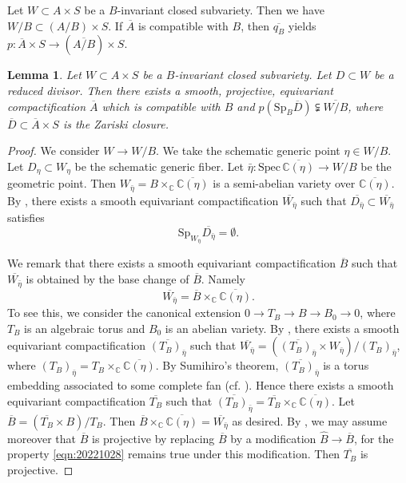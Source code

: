 \documentclass[11pt,english]{smfart}
\theoremstyle{plain}
\newtheorem{lem}[thm]{Lemma}
\theoremstyle{definition}
\theoremstyle{remark}
\numberwithin{equation}{section}
\theoremstyle{plain}
\begin{document}
	
	Let $W\subset A\times S$ be a $B$-invariant closed subvariety.
	Then we have $W/B\subset (A/B)\times S$.
	If $\overline{A}$ is compatible with $B$, then $\overline{q_B}$ yields $p:\overline{A}\times S\to(\overline{A/B})\times S$.
	
	
	\begin{lem}\label{lem:20221124}
		Let $W\subset A\times S$ be a $B$-invariant closed subvariety.
		Let $D\subset W$ be a reduced divisor.
		Then there exists a smooth, projective, equivariant compactification $\overline{A}$ which is compatible with $B$ and $p(\mathrm{Sp}_B\overline{D})\subsetneqq \overline{W/B}$, where $\overline{D}\subset \overline{A}\times S$ is the Zariski closure.
	\end{lem}
	
	\begin{proof}
		We consider $W\to W/B$.
		We take the schematic generic point $\eta\in W/B$.
		Let $D_{\eta}\subset W_{\eta}$ be the schematic generic fiber.
		Let $\bar{\eta}:\mathrm{Spec}\, \overline{\mathbb C(\eta)}\to W/B$ be the geometric point.
		Then $W_{\bar{\eta}}=B\times_{\mathbb C}\overline{\mathbb C(\eta)}$ is a semi-abelian variety over $\overline{\mathbb C(\eta)}$.
		By \cite[Lem 12.7]{Y22}, 
		there exists a smooth equivariant compactification $\overline{W_{\bar{\eta}}}$ such that $\overline{D_{\bar{\eta}}}\subset \overline{W_{\bar{\eta}}}$ satisfies 
		\begin{equation}\label{eqn:20221028}
			\mathrm{Sp}_{W_{\bar{\eta}}}\overline{D_{\bar{\eta}}}=\emptyset.
		\end{equation}
		
		
		We remark that there exists a smooth equivariant compactification $\overline{B}$ such that $\overline{W_{\bar{\eta}}}$ is obtained by the base change of $\overline{B}$.
		Namely
		$$\overline{W_{\bar{\eta}}}=\overline{B}\times_{\mathbb C}\overline{\mathbb C(\eta)}.$$
		To see this, we consider the canonical extension $0\to T_B\to B\to B_0\to 0$, where $T_B$ is an algebraic torus and $B_0$ is an abelian variety.
		By \cite[Lem A.6]{Y22}, there exists a smooth equivariant compactification $\overline{(T_B)_{\bar{\eta}}}$ such that $\overline{W_{\bar{\eta}}}=(\overline{(T_B)_{\bar{\eta}}}\times W_{\bar{\eta}})/(T_B)_{\bar{\eta}}$, where $(T_B)_{\bar{\eta}}=T_B\times_{\mathbb C}\overline{\mathbb C(\eta)}$.
		By Sumihiro's theorem, $\overline{(T_B)_{\bar{\eta}}}$ is a torus embedding associated to some complete fan (cf. \cite[Sec. A.2]{Y22}).
		Hence there exists a smooth equivariant compactification $\overline{T_B}$ such that $\overline{(T_B)_{\bar{\eta}}}=\overline{T_B}\times_{\mathbb C}\overline{\mathbb C(\eta)}$.
		Let $\overline{B}=(\overline{T_B}\times B)/T_B$.
		Then $\overline{B}\times_{\mathbb C}\overline{\mathbb C(\eta)}=\overline{W_{\bar{\eta}}}$ as desired.
		By \cite[Lem A.8]{Y22}, we may assume moreover that $\overline{B}$ is projective by replacing $\overline{B}$ by a modification $\hat{B}\to \overline{B}$, for the property \eqref{eqn:20221028} remains true under this modification.
		Then $\overline{T_B}$ is projective.
		

\end{proof}
\end{document}

